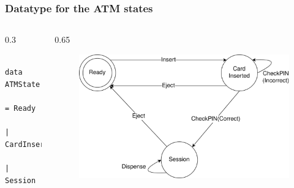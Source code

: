 \documentclass[compress]{beamer}
\begin{document}
\begin{frame}[fragile]
  \frametitle{Datatype for the ATM states}

  \begin{columns}
  \begin{column}{0.3\framewidth}
    \begin{verbatim}
      data ATMState
        = Ready
        | CardInserted
        | Session
    \end{verbatim}
  \end{column}

  \begin{column}{0.65\framewidth}
    \begin{figure}
    \includegraphics[alt={The state diagram from slide 7.},width=\textwidth]{ATM.png}
    \end{figure}
  \end{column}
  \end{columns}

\end{frame}
\end{document}
